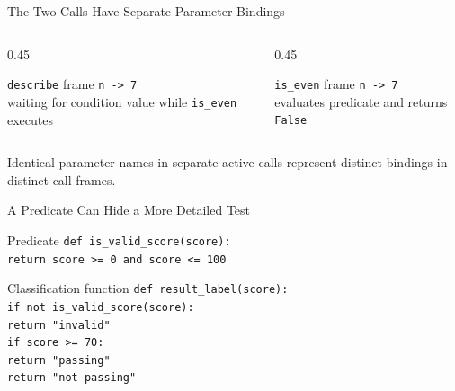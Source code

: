 \documentclass[aspectratio=169,10pt]{beamer}
\begin{document}
\begin{frame}{The Two Calls Have Separate Parameter Bindings}
  \begin{columns}[T,onlytextwidth]
    \begin{column}{0.45\textwidth}
      \begin{block}{\texttt{describe} frame}
        \texttt{n -> 7}\\[0.08in]
        waiting for condition value while \texttt{is\_even} executes
      \end{block}
    \end{column}

    \begin{column}{0.45\textwidth}
      \begin{block}{\texttt{is\_even} frame}
        \texttt{n -> 7}\\[0.08in]
        evaluates predicate and returns \texttt{False}
      \end{block}
    \end{column}
  \end{columns}

  \begin{keyidea}
    Identical parameter names in separate active calls represent distinct bindings in distinct call frames.
  \end{keyidea}
\end{frame}

\begin{frame}{A Predicate Can Hide a More Detailed Test}
  \begin{block}{Predicate}
    \texttt{def is\_valid\_score(score):}\\
    \hspace*{0.20in}\texttt{return score >= 0 and score <= 100}
  \end{block}

  \begin{block}{Classification function}
    \texttt{def result\_label(score):}\\
    \hspace*{0.20in}\texttt{if not is\_valid\_score(score):}\\
    \hspace*{0.40in}\texttt{return "invalid"}\\
    \hspace*{0.20in}\texttt{if score >= 70:}\\
    \hspace*{0.40in}\texttt{return "passing"}\\
    \hspace*{0.20in}\texttt{return "not passing"}
  \end{block}
\end{frame}
\end{document}
